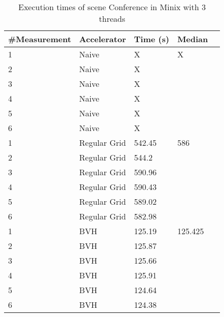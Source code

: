 \begin{table}[H]
	\small
	\begin{tabular}{|l|l|l|l|l|}
		\hline
		\#Measurement & Accelerator & Time (s) & Median \\ \hline
		1 & Naive & X & X \\ \hline
		2 & Naive & X & \\ \hline
		3 & Naive & X & \\ \hline
		4 & Naive & X & \\ \hline
		5 & Naive & X & \\ \hline
		6 & Naive & X & \\ \hline
		1 & Regular Grid & 542.45 & 586 \\ \hline
		2 & Regular Grid & 544.2 & \\ \hline
		3 & Regular Grid & 590.96 & \\ \hline
		4 & Regular Grid & 590.43 & \\ \hline
		5 & Regular Grid & 589.02 & \\ \hline
		6 & Regular Grid & 582.98 & \\ \hline
		1 & BVH & 125.19 & 125.425 \\ \hline
		2 & BVH & 125.87 & \\ \hline
		3 & BVH & 125.66 & \\ \hline
		4 & BVH & 125.91 & \\ \hline
		5 & BVH & 124.64 & \\ \hline
		6 & BVH & 124.38 & \\ \hline
	\end{tabular}
	\label{Time}
	\caption{Execution times of scene Conference in Minix with 3 threads}
\end{table}

